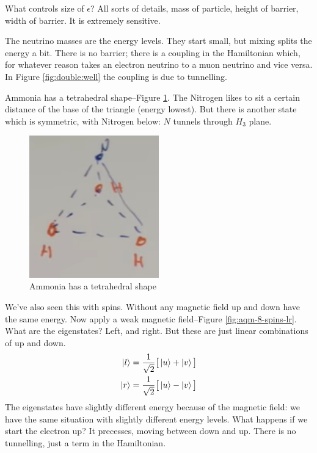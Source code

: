\documentclass[]{article}
\begin{document}
What controls size of $\epsilon$? All sorts of details, mass of particle, height of barrier, width of barrier. It is extremely sensitive. 

The neutrino masses are the energy levels. They start small, but mixing splits the energy a bit. There is no barrier; there is a coupling in the Hamiltonian which, for whatever reason takes an electron neutrino to a muon neutrino and vice versa. In Figure \ref{fig:double:well} the coupling is due to tunnelling.

Ammonia has a tetrahedral shape--Figure \ref{fig:aqm-8-nh3}. The Nitrogen likes to sit a certain distance of the base of the triangle (energy lowest). But there is another state which is symmetric, with Nitrogen below: $N$ tunnels through $H_3$ plane. 

\begin{figure}[H]
	\begin{center}
		\caption{Ammonia has a tetrahedral shape}\label{fig:aqm-8-nh3}
		\includegraphics[width=0.5\textwidth]{aqm-8-nh3}
	\end{center}
\end{figure}

We've also seen this with spins. Without any magnetic field up and down have the same energy. Now apply a weak magnetic field--Figure \ref{fig:aqm-8-spins-lr}. What are the eigenstates? Left, and right. But these are just linear combinations of up and down.
\begin{align*}
	\ket{l} = \frac{1}{\sqrt{2}}\big[\ket{u} + \ket{v}\big]\\
	\ket{r} = \frac{1}{\sqrt{2}}\big[\ket{u} - \ket{v}\big]
\end{align*}
The eigenstates have slightly different energy because of the magnetic field: we have the same situation with slightly different energy levels. What happens if we start the electron up? It precesses, moving between down and up. There is no tunnelling, just a term in the Hamiltonian. 
\end{document}
